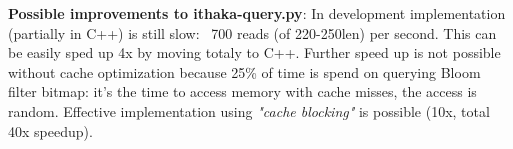 \documentclass[portrait,final,a0paper,fontscale=0.277]{baposter}
\begin{document}
\begin{poster}
{\begin{minipage}{0.46\textwidth}
%
%
{\bf Possible improvements to ithaka-query.py}:
In development implementation (partially in C++) is still slow: ~700 reads (of 220-250len) per second. This can be easily sped up 4x by moving totaly to C++.
Further speed up is not possible without cache optimization because 25\% of time is spend on querying Bloom filter bitmap: it's the time to access memory with cache misses, the access is random. Effective implementation using {\em "cache blocking"} is possible (10x, total 40x speedup).
% 
% 



\end{minipage}}
\end{poster}
\end{document}
